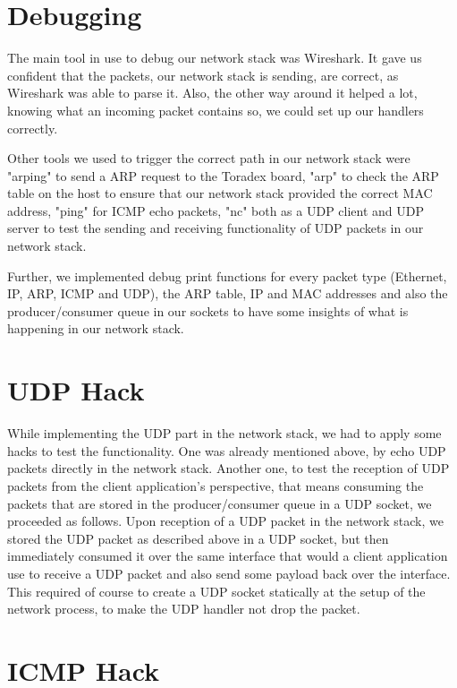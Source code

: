 \section{Debugging}

The main tool in use to debug our network stack was Wireshark. It gave us
confident that the packets, our network stack is sending, are correct, as
Wireshark was able to parse it. Also, the other way around it helped a lot,
knowing what an incoming packet contains so, we could set up our handlers
correctly.

Other tools we used to trigger the correct path in our network stack were
"arping" to send a ARP request to the Toradex board, "arp" to check the ARP
table on the host to ensure that our network stack provided the correct MAC
address, "ping" for ICMP echo packets, "nc" both as a UDP client and UDP server
to test the sending and receiving functionality of UDP packets in our network
stack.

Further, we implemented debug print functions for every packet type (Ethernet,
IP, ARP, ICMP and UDP), the ARP table, IP and MAC addresses and also the
producer/consumer queue in our sockets to have some insights of what is
happening in our network stack.

\section{UDP Hack}

While implementing the UDP part in the network stack, we had to apply some hacks
to test the functionality. One was already mentioned above, by echo UDP packets
directly in the network stack.  Another one, to test the reception of UDP
packets from the client application's perspective, that means consuming the
packets that are stored in the producer/consumer queue in a UDP socket, we
proceeded as follows. Upon reception of a UDP packet in the network stack, we
stored the UDP packet as described above in a UDP socket, but then immediately
consumed it over the same interface that would a client application use to
receive a UDP packet and also send some payload back over the interface. This
required of course to create a UDP socket statically at the setup of the network
process, to make the UDP handler not drop the packet.

\section{ICMP Hack}

